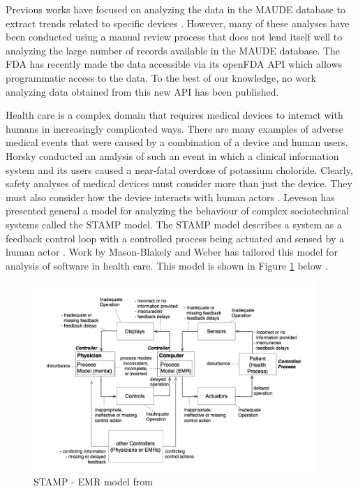 \documentclass[11pt, notitlepage,abstracton,oneside]{article}   	%
\begin{document}
Previous works have focused on analyzing the data in the MAUDE database to extract trends related to specific devices \cite{weber_preliminary_2011}. However, many of these analyses have been conducted using a manual review process that does not lend itself well to analyzing the large number of records available in the MAUDE database. The FDA has recently made the data accessible via its openFDA API which allows programmatic access to the data. To the best of our knowledge, no work analyzing data obtained from this new API has been published.

Health care is a complex domain that requires medical devices to interact with humans in increasingly complicated ways. There are many examples of adverse medical events that were caused by a combination of a device and human users. Horsky conducted an analysis of such an event \cite{horsky_2005} in which a clinical information system and its users caused a near-fatal overdose of potassium choloride. Clearly, safety analyses of medical devices must consider more than just the device. They must also consider how the device interacts with human actors \cite{karsh_health_2010}. Leveson has presented general a model for analyzing the behaviour of complex sociotechnical systems called the STAMP model. The STAMP model describes a system as a feedback control loop with a controlled process being actuated and sensed by a human actor \cite{leveson_engineering_2012}. Work by Mason-Blakely and Weber has tailored this model for analysis of software in health care. This model is shown in Figure \ref{fig:stamp-emr} below \cite{stamp_emr_2011}.

\begin{figure}[ht]
	\centering
	\includegraphics[width=0.95\textwidth]{figures/stamp-emr}
	\caption{STAMP - EMR model from \cite{stamp_emr_2011}}
	\label{fig:stamp-emr}
\end{figure}
\end{document}
